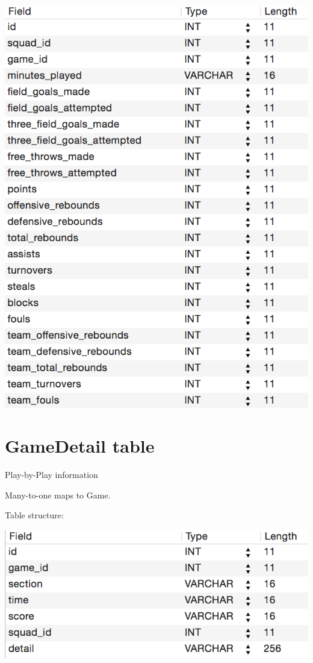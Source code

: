\documentclass[letterpaper,10pt,english]{sphinxmanual}
\begin{document}
\includegraphics{SquadGameStat_table.png}


\section{GameDetail table}
\label{_static/database:gamedetail-table}
Play-by-Play information

Many-to-one maps to Game.

Table structure:

\includegraphics{GameDetail_table.png}
\end{document}
